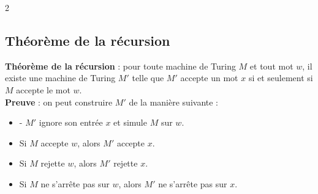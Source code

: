 \documentclass[11pt]{article}
\begin{document}
\begin{multicols}{2}
\subsection{Théorème de la récursion}
\textbf{Théorème de la récursion} : pour toute machine de Turing $M$ et tout mot $w$, il existe une machine de Turing $M'$ telle que $M'$ accepte un mot $x$ si et seulement si $M$ accepte le mot $w$.\\
\textbf{Preuve} : on peut construire $M'$ de la manière suivante :
\begin{itemize}[noitemsep]
  \item- $M'$ ignore son entrée $x$ et simule $M$ sur $w$.\\
  \item Si $M$ accepte $w$, alors $M'$ accepte $x$.\\
  \item Si $M$ rejette $w$, alors $M'$ rejette $x$.\\
  \item Si $M$ ne s'arrête pas sur $w$, alors $M'$ ne s'arrête pas sur $x$.\\
\end{itemize}


\end{multicols}
\end{document}
